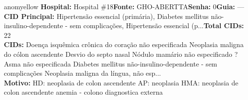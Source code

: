 \documentclass[a4paper,10pt]{article}
\begin{document}
\begin{anomalycard}[Interna\c{c}\~{a}o \#7569 | Pac. \#6308 | MODERADO (z=2.48) | LOS: 6d | 05/03/2026\,$\to$\,11/03/2026]{anomyellow}
\textbf{Hospital:} Hospital \#18\quad \textbf{Fonte:} GHO-ABERTTA\quad \textbf{Senha:} 0\quad \textbf{Guia:} ---\\

\textbf{CID Principal:} {\small Hipertensão essencial (primária), Diabetes mellitus não-insulino-dependente - sem complicações, Hipertensão essencial (p...}\quad\textbf{Total CIDs:} 22\\

\textbf{CIDs:} {\scriptsize Doença isquêmica crônica do coração não especificada \textbar{} Neoplasia maligna do cólon ascendente \textbar{} Desvio do septo nasal \textbar{} Nódulo mamário não especificado \textbar{} ? \textbar{} Asma não especificada \textbar{} Diabetes mellitus não-insulino-dependente - sem complicações \textbar{} Neoplasia maligna da língua, não esp...}\\

\textbf{Motivo:} {\scriptsize HD:  neoplasia de colon ascendente AP: neoplasia  HMA:  neoplasia de colon ascendente anemia - colono diagnostica externa}\\




\end{anomalycard}
\end{document}
